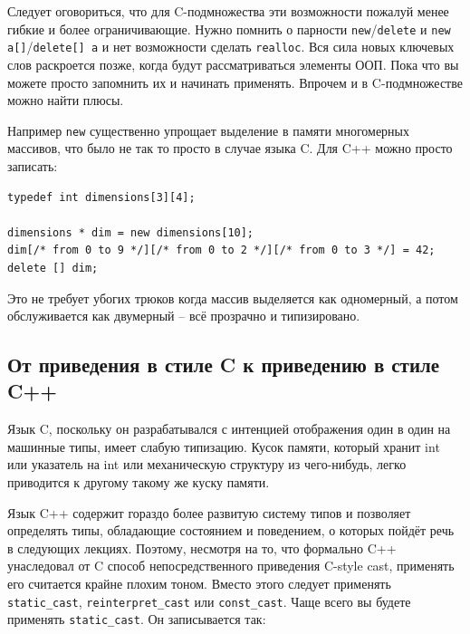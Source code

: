 \documentclass[a4paper,12pt,oneside]{article}
\begin{document}


Следует оговориться, что для C-подмножества эти возможности пожалуй менее гибкие и более ограничивающие. Нужно помнить о парности \lstinline!new!/\lstinline!delete! и \lstinline!new a[]!/\lstinline!delete[] a! и нет возможности сделать \lstinline!realloc!. Вся сила новых ключевых слов раскроется позже, когда будут рассматриваться элементы ООП. Пока что вы можете просто запомнить их и начинать применять. Впрочем и в C-подмножестве можно найти плюсы.

Например \lstinline!new! существенно упрощает выделение в памяти многомерных массивов, что было не так то просто в случае языка C. Для C++ можно просто записать:

\begin{lstlisting}
typedef int dimensions[3][4];

dimensions * dim = new dimensions[10];
dim[/* from 0 to 9 */][/* from 0 to 2 */][/* from 0 to 3 */] = 42;
delete [] dim;
\end{lstlisting}

Это не требует убогих трюков когда массив выделяется как одномерный, а потом обслуживается как двумерный -- всё прозрачно и типизировано.

\subsection{От приведения в стиле C к приведению в стиле C++}

Язык C, поскольку он разрабатывался с интенцией отображения один в один на машинные типы, имеет слабую типизацию. Кусок памяти, который хранит int или указатель на int или механическую структуру из чего-нибудь, легко приводится к другому такому же куску памяти.



Язык C++ содержит гораздо более развитую систему типов и позволяет определять типы, обладающие состоянием и поведением, о которых пойдёт речь в следующих лекциях. Поэтому, несмотря на то, что формально C++ унаследовал от C способ непосредственного приведения C-style cast, применять его считается крайне плохим тоном. Вместо этого следует применять \lstinline!static_cast!, \lstinline!reinterpret_cast! или \lstinline!const_cast!. Чаще всего вы будете применять \lstinline!static_cast!. Он записывается так:
\end{document}
